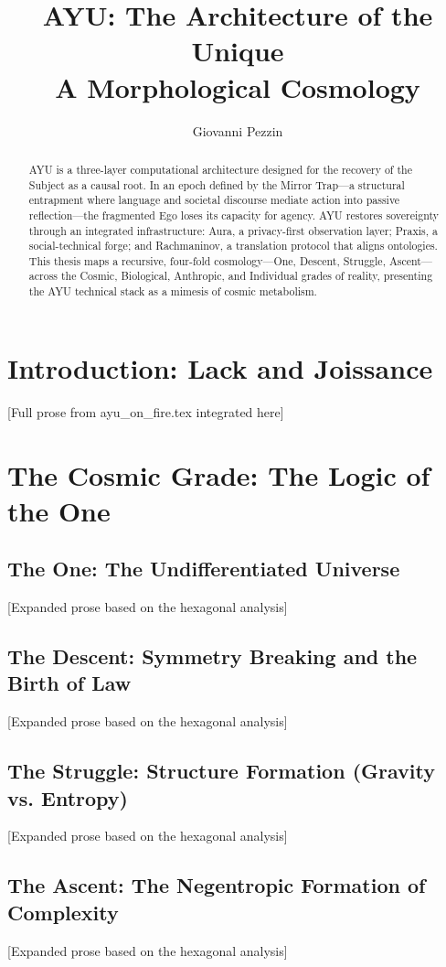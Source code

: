 \documentclass[12pt,a4paper]{report}
\title{AYU: The Architecture of the Unique \\ \large A Morphological Cosmology}
\author{Giovanni Pezzin}
\begin{document}
\maketitle

\begin{abstract}
AYU is a three-layer computational architecture designed for the recovery of the Subject as a causal root. In an epoch defined by the Mirror Trap—a structural entrapment where language and societal discourse mediate action into passive reflection—the fragmented Ego loses its capacity for agency. AYU restores sovereignty through an integrated infrastructure: Aura, a privacy-first observation layer; Praxis, a social-technical forge; and Rachmaninov, a translation protocol that aligns ontologies. This thesis maps a recursive, four-fold cosmology—One, Descent, Struggle, Ascent—across the Cosmic, Biological, Anthropic, and Individual grades of reality, presenting the AYU technical stack as a mimesis of cosmic metabolism.
\end{abstract}

\tableofcontents

\chapter*{Introduction: Lack and Joissance}
[Full prose from ayu_on_fire.tex integrated here]

\chapter{The Cosmic Grade: The Logic of the One}
\section{The One: The Undifferentiated Universe}
[Expanded prose based on the hexagonal analysis]
\section{The Descent: Symmetry Breaking and the Birth of Law}
[Expanded prose based on the hexagonal analysis]
\section{The Struggle: Structure Formation (Gravity vs. Entropy)}
[Expanded prose based on the hexagonal analysis]
\section{The Ascent: The Negentropic Formation of Complexity}
[Expanded prose based on the hexagonal analysis]
\end{document}
